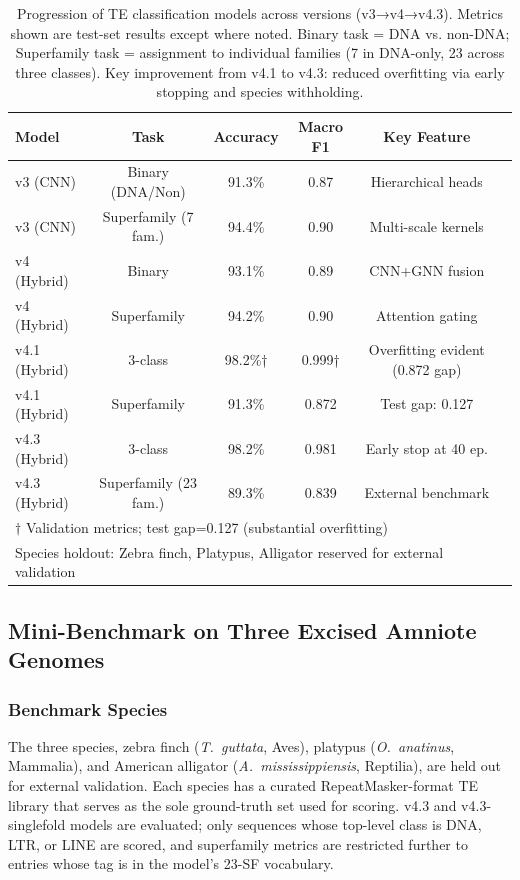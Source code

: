 \documentclass[12pt]{article}
\begin{document}
\FloatBarrier
\begin{table}[H]
\centering
\begin{tabular}{lccccc}
\hline
Model & Task & Accuracy & Macro F1 & Key Feature \\
\hline
v3 (CNN) & Binary (DNA/Non) & 91.3\% & 0.87 & Hierarchical heads \\
v3 (CNN) & Superfamily (7 fam.) & 94.4\% & 0.90 & Multi-scale kernels \\
v4 (Hybrid) & Binary & 93.1\% & 0.89 & CNN+GNN fusion \\
v4 (Hybrid) & Superfamily & 94.2\% & 0.90 & Attention gating \\
v4.1 (Hybrid) & 3-class & 98.2\%† & 0.999†  & Overfitting evident (0.872 gap) \\
v4.1 (Hybrid) & Superfamily & 91.3\% & 0.872 & Test gap: 0.127 \\
v4.3 (Hybrid) & 3-class & 98.2\% & 0.981 &  Early stop at 40 ep. \\
v4.3 (Hybrid) & Superfamily (23 fam.) & 89.3\% & 0.839 & External benchmark \\
\hline
\multicolumn{6}{l}{$\dagger$ Validation metrics; test gap=0.127 (substantial overfitting)} \\
\multicolumn{6}{l}{Species holdout: Zebra finch, Platypus, Alligator reserved for external validation}
\end{tabular}
\caption{Progression of TE classification models across versions (v3→v4→v4.3). Metrics shown are test-set results except where noted. Binary task = DNA vs. non-DNA; Superfamily task = assignment to individual families (7 in DNA-only, 23 across three classes). Key improvement from v4.1 to v4.3: reduced overfitting via early stopping and species withholding.}
\label{tab:model\_progression}
\end{table}

\fi

\subsection{Mini-Benchmark on Three Excised Amniote Genomes}\label{ssec:mini_benchmark}

\subsubsection{Benchmark Species}

The three species, zebra finch (\textit{T.~guttata}, Aves), platypus (\textit{O.~anatinus}, Mammalia), and American alligator (\textit{A.~mississippiensis}, Reptilia), are held out for external validation. Each species has a curated RepeatMasker-format TE library that serves as the sole ground-truth set used for scoring. v4.3 and v4.3-singlefold models are evaluated; only sequences whose top-level class is DNA, LTR, or LINE are scored, and superfamily metrics are restricted further to entries whose tag is in the model's 23-SF vocabulary.
\end{document}
